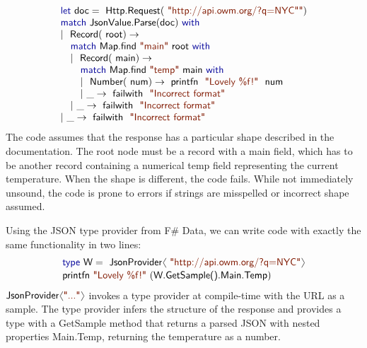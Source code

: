 \documentclass[10pt]{sigplanconf}
\newcommand{\langl}{\begin{picture}(4.5,7)
\put(1.1,2.5){\rotatebox{60}{\line(1,0){5.5}}}
\put(1.1,2.5){\rotatebox{300}{\line(1,0){5.5}}}
\end{picture}}
\newcommand{\rangl}{\begin{picture}(4.5,7)
\put(.9,2.5){\rotatebox{120}{\line(1,0){5.5}}}
\put(.9,2.5){\rotatebox{240}{\line(1,0){5.5}}}
\end{picture}}
\newcommand{\kvd}[1]{\textnormal{\textcolor{kvdclr}{\sffamily #1}}}
\newcommand{\str}[1]{\textnormal{\textcolor{strclr}{\sffamily "#1"}}}
\newcommand{\strf}[1]{\textnormal{\textcolor{strclr}{\sffamily #1}}}
\newcommand{\ident}[1]{\textnormal{\sffamily #1}}
\begin{document}
\noindent
\begin{equation*}
\begin{array}{l}
 \kvd{let}~\ident{doc}=\ident{Http.Request}(\str{http://api.owm.org/?q=NYC"}) \\
 \kvd{match}~\ident{JsonValue.Parse}(\ident{doc})~\kvd{with} \\
 |~\ident{Record}(\ident{root})\rightarrow \\
 \quad \kvd{match}~\ident{Map.find}~\str{main}~\ident{root}~\kvd{with} \\
 \quad |~\ident{Record}(\ident{main})\rightarrow \\
 \quad \quad \kvd{match}~\ident{Map.find}~\str{temp}~\ident{main}~\kvd{with} \\
 \quad \quad |~\ident{Number}(\ident{num})\rightarrow \ident{printfn}~\str{Lovely \%f!}~\ident{num} \\
 \quad \quad |~\_\rightarrow \ident{failwith}~\str{Incorrect format} \\
 \quad |~\_\rightarrow \ident{failwith}~\str{Incorrect format} \\
 |~\_\rightarrow \ident{failwith}~\str{Incorrect format} 
\end{array}
\end{equation*}
%
The code assumes that the response has a particular shape described in the documentation. The
root node must be a record with a \strf{main} field, which has to be another record containing
a numerical \strf{temp} field representing the current temperature. When the shape is different, 
the code fails. While not immediately unsound, the code is prone to errors if strings are 
misspelled or incorrect shape assumed.

Using the JSON type provider from F\# Data, we can write code with exactly the 
same functionality in two lines:
%
\vspace{-0.1em}
\begin{equation*}
\begin{array}{l}
 \kvd{type}~\ident{W} = \ident{JsonProvider}\langl\str{http://api.owm.org/?q=NYC}\rangl \\[0.1em]
 \ident{printfn}~\str{Lovely \%f!}~(\ident{W.GetSample().Main.Temp})
\end{array}
\end{equation*}
%
$\ident{JsonProvider}\langl\str{...}\rangl$ invokes a type provider \cite{fsharp-typeprov} at 
compile-time with the URL as a sample. The type provider infers the structure of the response
and provides a type with a \ident{GetSample} method that returns a parsed JSON with nested
properties \ident{Main.Temp}, returning the temperature as a number.
\end{document}
